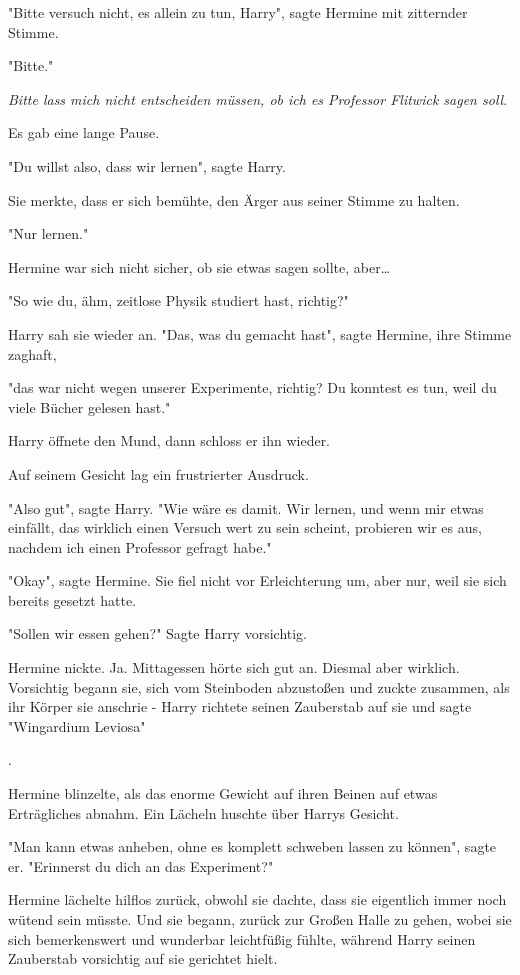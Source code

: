 {"Bitte versuch nicht, es allein zu tun, Harry", sagte Hermine mit zitternder Stimme.

"Bitte."

\emph{Bitte lass mich nicht entscheiden müssen, ob ich es Professor Flitwick sagen soll}.

Es gab eine lange Pause.

"Du willst also, dass wir lernen", sagte Harry.

Sie merkte, dass er sich bemühte, den Ärger aus seiner Stimme zu halten.

"Nur lernen."

Hermine war sich nicht sicher, ob sie etwas sagen sollte, aber…

"So wie du, ähm, zeitlose Physik studiert hast, richtig?"

Harry sah sie wieder an. "Das, was du gemacht hast", sagte Hermine, ihre Stimme zaghaft,

"das war nicht wegen unserer Experimente, richtig? Du konntest es tun, weil du viele Bücher gelesen hast."

Harry öffnete den Mund, dann schloss er ihn wieder.

Auf seinem Gesicht lag ein frustrierter Ausdruck.

"Also gut", sagte Harry. "Wie wäre es damit. Wir lernen, und wenn mir etwas einfällt, das wirklich einen Versuch wert zu sein scheint, probieren wir es aus, nachdem ich einen Professor gefragt habe."

"Okay", sagte Hermine. Sie fiel nicht vor Erleichterung um, aber nur, weil sie sich bereits gesetzt hatte.

"Sollen wir essen gehen?" Sagte Harry vorsichtig.

Hermine nickte. Ja. Mittagessen hörte sich gut an. Diesmal aber wirklich. Vorsichtig begann sie, sich vom Steinboden abzustoßen und zuckte zusammen, als ihr Körper sie anschrie - Harry richtete seinen Zauberstab auf sie und sagte "Wingardium Leviosa"

.

Hermine blinzelte, als das enorme Gewicht auf ihren Beinen auf etwas Erträgliches abnahm. Ein Lächeln huschte über Harrys Gesicht.

"Man kann etwas anheben, ohne es komplett schweben lassen zu können", sagte er. "Erinnerst du dich an das Experiment?"

Hermine lächelte hilflos zurück, obwohl sie dachte, dass sie eigentlich immer noch wütend sein müsste. Und sie begann, zurück zur Großen Halle zu gehen, wobei sie sich bemerkenswert und wunderbar leichtfüßig fühlte, während Harry seinen Zauberstab vorsichtig auf sie gerichtet hielt.

}

